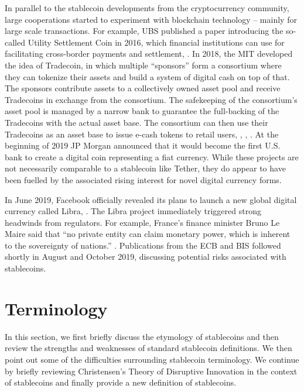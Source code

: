 \documentclass[conference]{IEEEtran}
\begin{document}
In parallel to the stablecoin developments from the cryptocurrency community, large cooperations started to experiment with blockchain technology -- mainly for large scale transactions. For example, UBS published a paper introducing the so-called Utility Settlement Coin in 2016, which financial institutions can use for facilitating cross-border payments and settlement, \cite{UBS}. In 2018, the MIT developed the idea of Tradecoin, in which multiple ``sponsors'' form a consortium where they can tokenize their assets and build a system of digital cash on top of that. The sponsors contribute assets to a collectively owned asset pool and receive Tradecoins in exchange from the consortium. The safekeeping of the consortium's asset pool is managed by a narrow bank to guarantee the full-backing of the Tradecoins with the actual asset base. The consortium can then use their Tradecoins as an asset base to issue e-cash tokens to retail users, \cite{Lipton}, \cite{Lipton3}, \cite{Lipton4}. At the beginning of 2019 JP Morgan announced that it would become the first U.S. bank to create a digital coin representing a fiat currency. While these projects are not necessarily comparable to a stablecoin like Tether, they do appear to have been fuelled by the associated rising interest for novel digital currency forms. 

In June 2019, Facebook officially revealed its plans to launch a new global digital currency called Libra, \cite{WSJ}. The Libra project immediately triggered strong headwinds from regulators. For example, France's finance minister Bruno Le Maire said that ``no private entity can claim monetary power, which is inherent to the sovereignty of nations.'' \cite{Reuters}. Publications from the \ac{ECB} and \ac{BIS} followed shortly in August and October 2019, discussing potential risks associated with stablecoins.

\section{Terminology}
In this section, we first briefly discuss the etymology of stablecoins and then review the strengths and weaknesses of standard stablecoin definitions. We then point out some of the difficulties surrounding stablecoin terminology. We continue by briefly reviewing Christensen's Theory of Disruptive Innovation in the context of stablecoins and finally provide a new definition of stablecoins.
\end{document}
